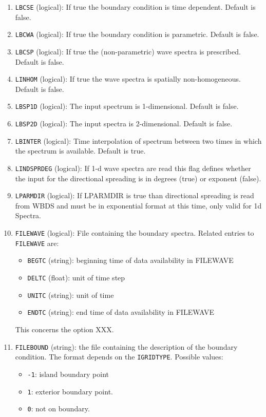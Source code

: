 \documentclass[12pt]{amsart}
\begin{document}
\begin{enumerate}
\item {\tt LBCSE} (logical): If true the boundary condition is time dependent. Default is false.
\item {\tt LBCWA} (logical): If true the boundary condition is parametric. Default is false.
\item {\tt LBCSP} (logical): If true the (non-parametric) wave spectra is prescribed. Default is false.
\item {\tt LINHOM} (logical): If true the wave spectra is spatially non-homogeneous. Default is false.
\item {\tt LBSP1D} (logical): The input spectrum is 1-dimensional. Default is false.
\item {\tt LBSP2D} (logical): The input spectra is 2-dimensional. Default is false.
\item {\tt LBINTER} (logical): Time interpolation of spectrum between two times in which the spectrum is available. Default is true.
\item {\tt LINDSPRDEG} (logical): If 1-d wave spectra are read this flag defines whether the input for the directional spreading is in degrees (true) or exponent (false).
\item {\tt LPARMDIR} (logical): If LPARMDIR is true than directional spreading is read from WBDS and must be in exponential format at this time, only valid for 1d Spectra.
\item {\tt FILEWAVE} (logical): File containing the boundary spectra. Related entries to {\tt FILEWAVE} are:
  \begin{itemize}
  \item {\tt BEGTC} (string): beginning time of data availability in FILEWAVE
  \item {\tt DELTC} (float): unit of time step
  \item {\tt UNITC} (string): unit of time
  \item {\tt ENDTC} (string): end time of data availability in FILEWAVE
  \end{itemize}
  This concerns the option XXX.
\item {\tt FILEBOUND} (string): the file containing the description of the boundary condition. The format depends on the {\tt IGRIDTYPE}. Possible values:
  \begin{itemize}
  \item {\tt -1}: island boundary point
  \item {\tt 1}: exterior boundary point.
  \item {\tt 0}: not on boundary.

\end{itemize}
\end{enumerate}
\end{document}
